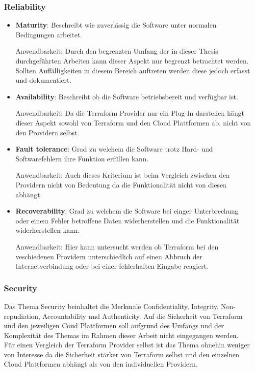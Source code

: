 \subsubsection{Reliability}

\begin{itemize}
  \item \textbf{Maturity}: Beschreibt wie zuverlässig die Software unter
  normalen Bedingungen arbeitet.

  Anwendbarkeit: Durch den begrenzten Umfang der in dieser Thesis
  durchgeführten Arbeiten kann dieser Aspekt nur begrenzt betrachtet
  werden. Sollten Auffälligkeiten in diesem Bereich auftreten werden
  diese jedoch erfasst und dokumentiert.

  \item \textbf{Availability}: Beschreibt ob die Software betriebsbereit
  und verfügbar ist.

  Anwendbarkeit: Da die Terraform Provider nur ein Plug-In darstellen
  hängt dieser Aspekt sowohl von Terraform und den Cloud Plattformen ab,
  nicht von den Providern selbst.

  \item \textbf{Fault tolerance}: Grad zu welchem die Software trotz
  Hard- und Softwarefehlern ihre Funktion erfüllen kann.

  Anwendbarkeit: Auch dieses Kriterium ist beim Vergleich zwischen den
  Providern nicht von Bedeutung da die Funktionalität nicht von diesen
  abhängt.

  \item \textbf{Recoverability}: Grad zu welchem die Software bei einger
  Unterbrechung oder einem Fehler betroffene Daten widerherstellen und
  die Funktionalität widerherstellen kann.

  Anwendbarkeit: Hier kann untersucht werden ob Terraform bei
  den veschiedenen Providern unterschiedlich auf einen Abbruch der 
  Internetverbindung oder bei einer fehlerhaften Eingabe reagiert.

\end{itemize}

\subsubsection{Security}

Das Thema Security beinhaltet die Merkmale Confidentiality, Integrity,
Non-repudiation, Accountability und Authenticity. Auf die
Sicherheit von Terraform und den jeweiligen Coud Plattformen soll
aufgrund des Umfangs und der Komplexität des Themas im Rahmen dieser
Arbeit nicht eingegangen werden. Für einen Vergleich der Terraform
Provider selbst ist das Thema ohnehin weniger von Interesse da die
Sicherheit stärker von Terraform selbst und den einzelnen Cloud
Plattformen abhängt als von den individuellen Providern. 

